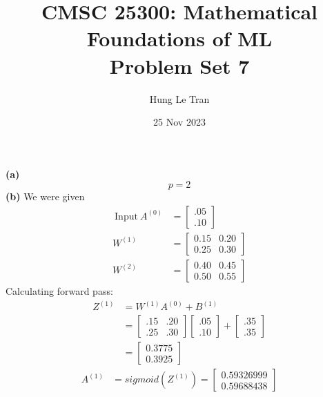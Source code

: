\documentclass[a4paper, 12pt]{article}
\title{CMSC 25300: Mathematical Foundations of ML \\ \large Problem Set 7}
\date{25 Nov 2023}
\author{Hung Le Tran}
\begin{document}
\maketitle
\setcounter{section}{7}
\begin{problem} [Problem 2]
\end{problem}
\begin{solution}
    \textbf{(a)} \[
        p = 2      
    \]
    \textbf{(b)}
    We were given \begin{align*}
        \:\text{Input}\: A^{(0)} &= \begin{bmatrix}
            .05 \\
            .10
            \end{bmatrix} \\
            W^{(1)} &= \begin{bmatrix}
            0.15 & 0.20 \\
            0.25 & 0.30
            \end{bmatrix} \\
            W^{(2)} &= \begin{bmatrix}
            0.40 & 0.45 \\
            0.50 & 0.55
            \end{bmatrix}
    \end{align*}
    Calculating forward pass:
    \begin{align*}
        Z^{(1)} &= W^{(1)} A^{(0)} + B^{(1)} \\
        &= \begin{bmatrix}
        .15 & .20 \\
        .25 & .30
        \end{bmatrix} \begin{bmatrix}
        .05\\
        .10
        \end{bmatrix} + \begin{bmatrix}
        .35 \\
        .35
        \end{bmatrix} \\
        &= \begin{bmatrix}
        0.3775\\
        0.3925
        \end{bmatrix}
    \end{align*}
    \begin{align*}
        A^{(1)} &= sigmoid(Z^{(1)}) = \begin{bmatrix}
        0.59326999 \\ 0.59688438

\end{bmatrix}
\end{align*}
\end{solution}
\end{document}
